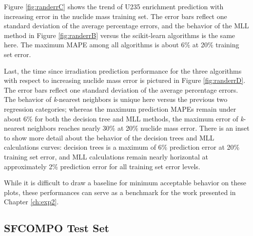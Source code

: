 Figure \ref{fig:randerrC} shows the trend of \gls{U235} enrichment prediction
with increasing error in the nuclide mass training set.  The error bars reflect
one standard deviation of the average percentage errors, and the behavior of
the \gls{MLL} method in Figure \ref{fig:randerrB} versus the scikit-learn
algorithms is the same here.  The maximum \gls{MAPE} among all algorithms is
about 6\% at 20\% training set error. 

Last, the time since irradiation prediction performance for the three
algorithms with respect to increasing nuclide mass error is pictured in Figure
\ref{fig:randerrD}.  The error bars reflect one standard deviation of the
average percentage errors.  The behavior of \textit{k}-nearest neighbors is
unique here versus the previous two regression categories; whereas the maximum
prediction \gls{MAPE}s remain under about 6\% for both the decision tree and
\gls{MLL} methods, the maximum error of \textit{k}-nearest neighbors reaches
nearly 30\% at 20\% nuclide mass error.  There is an inset to show more detail
about the behavior of the decision trees and \gls{MLL} calculations curves:
decision trees is a maximum of 6\% prediction error at 20\% training set error,
and \gls{MLL} calculations remain nearly horizontal at approximately 2\%
prediction error for all training set error levels.   

While it is difficult to draw a baseline for minimum acceptable behavior on
these plots, these performances can serve as a benchmark for the work presented
in Chapter \ref{ch:exp2}. 



\subsection{SFCOMPO Test Set}
\label{sec:sfcompo}

